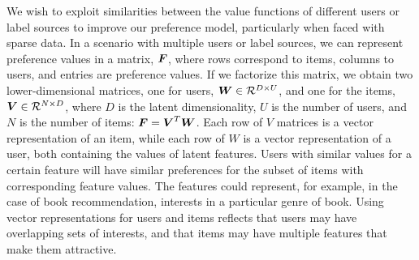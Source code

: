
We wish to exploit similarities between the value functions of different users or label sources to improve our preference model, particularly when faced with sparse data.
In a scenario with multiple users or label sources, 
we can represent preference values in a matrix, $\boldsymbol{F}$,
where rows correspond to items, columns to users, and entries are preference values.
If we factorize this matrix, we obtain two lower-dimensional matrices,
one for users, $\boldsymbol{W} \in \mathcal{R}^{D \times U}$, 
and one for the items, $\boldsymbol{V} \in \mathcal{R}^{N \times D}$,
where $D$ is the latent dimensionality, $U$ is the number of users, and $N$ is
the number of items: $\boldsymbol{F} = \boldsymbol{V}^T \boldsymbol{W}$.
Each row of $V$ matrices is a vector representation of an item, 
while each row of $W$ is a vector representation of a user, 
both containing the values of latent features.
Users with similar values for a certain feature will have similar preferences for 
the subset of items with corresponding feature values. 
The features could represent, for example, in the case of book recommendation, interests in a particular genre of book. 
Using vector representations for users and items reflects that users may have overlapping sets of interests,
and that items may have multiple features that make them attractive.

